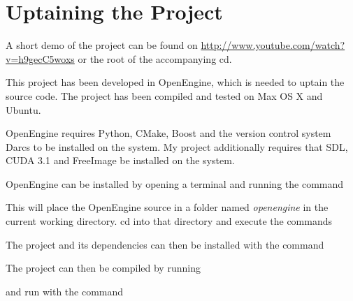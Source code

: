 \chapter{Uptaining the Project}

A short demo of the project can be found on
\url{http://www.youtube.com/watch?v=h9gecC5woxs} or the root of the accompanying
cd.

This project has been developed in OpenEngine, which is needed to uptain the
source code. The project has been compiled and tested on Max OS X and Ubuntu.

OpenEngine requires Python, CMake, Boost and the version control system Darcs to
be installed on the system. My project additionally requires that SDL, CUDA 3.1
and FreeImage be installed on the system.

OpenEngine can be installed by opening a terminal and running the
command


This will place the OpenEngine source in a folder named \textit{openengine} in
the current working directory. cd into that directory and execute the commands



The project and its dependencies can then be installed with the command


The project can then be compiled by running 


and run with the command

